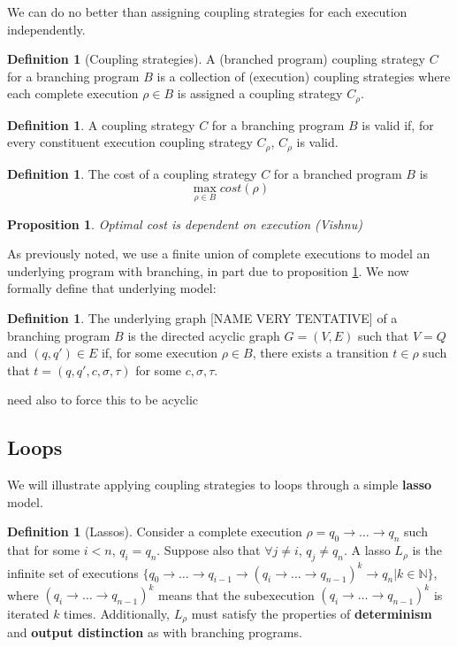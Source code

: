 \documentclass[12pt]{article}
\newcommand{\NN}{\mathbb{N}}
\newtheorem{prop}[thm]{Proposition}
\theoremstyle{definition}
\newtheorem{defn}[thm]{Definition}
\begin{document}
We can do no better than assigning coupling strategies for each execution independently. 
\begin{defn}[Coupling strategies]
    A (branched program) coupling strategy $C$ for a branching program $B$ is a collection of (execution) coupling strategies where each complete execution $\rho\in B$ is assigned a coupling strategy $C_\rho$. 
\end{defn}

\begin{defn}
    A coupling strategy $C$ for a branching program $B$ is valid if, for every constituent execution coupling strategy $C_\rho$, $C_\rho$ is valid. 
\end{defn}

\begin{defn}
    The cost of a coupling strategy $C$ for a branched program $B$ is \[
        \max_{\rho\in B}cost(\rho)
    \]
\end{defn}

\begin{prop}\label{costDependsExecutionProp}
    Optimal cost is dependent on execution (Vishnu)
\end{prop}

As previously noted, we use a finite union of complete executions to model an underlying program with branching, in part due to proposition \ref{costDependsExecutionProp}. We now formally define that underlying model:

\begin{defn}
    The underlying graph [NAME VERY TENTATIVE] of a branching program $B$ is the directed acyclic graph $G = (V, E)$ such that $V = Q$ and $(q, q')\in E$ if, for some execution $\rho\in B$, there exists a transition $t\in \rho$ such that $t = (q, q', c, \sigma, \tau)$ for some $c, \sigma, \tau$.  

    {\color{red} need also to force this to be acyclic}
\end{defn}


\subsection{Loops}

We will illustrate applying coupling strategies to loops through a simple \textbf{lasso} model. 

\begin{defn}[Lassos]
    Consider a complete execution $\rho = q_0\to\ldots \to q_n$ such that for some $i<n$, $q_i = q_n$. Suppose also that $\forall j\neq i$, $q_j \neq q_n$. A lasso $L_\rho$ is the infinite set of executions $\{q_0\to\ldots\to q_{i-1}\to (q_i\to\ldots\to q_{n-1})^k\to q_n| k\in \NN\}$, where $(q_i\to\ldots\to q_{n-1})^k$ means that the subexecution $(q_i\to\ldots\to q_{n-1})^k$ is iterated $k$ times. 
    Additionally, $L_\rho$ must satisfy the properties of \textbf{determinism} and \textbf{output distinction} as with branching programs.
\end{defn}
\end{document}
